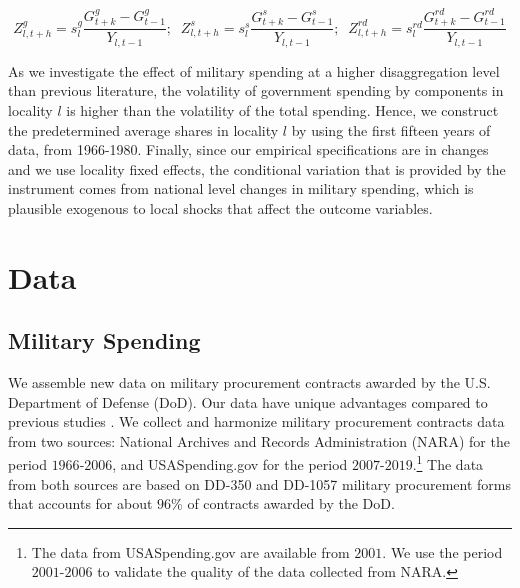 \documentclass[dv_diss_main.tex]{subfiles}
\begin{document}
\begin{equation}
    Z_{l,t+h}^g = s_{l}^g \frac{G^g_{t+k}-G^g_{t-1}}{Y_{l,t-1}};\;\;Z_{l,t+h}^s = s_{l}^s \frac{G^s_{t+k}-G^s_{t-1}}{Y_{l,t-1}};\;\;Z_{l,t+h}^{rd} = s_{l}^{rd} \frac{G^{rd}_{t+k}-G^{rd}_{t-1}}{Y_{l,t-1}}
    \label{eq:fm_iv2}
\end{equation}

As we investigate the effect of military spending at a higher disaggregation level than previous literature, the volatility of government spending by components in locality $l$ is higher than the volatility of the total spending. Hence, we construct the predetermined average shares in locality $l$ by using the first fifteen years of data, from 1966-1980. Finally, since our empirical specifications are in changes and we use locality fixed effects, the conditional variation that is provided by the instrument comes from national level changes in military spending, which is plausible exogenous to local shocks that affect the outcome variables.





\section{Data}
\label{sec:data}


\subsection{Military Spending}
\label{subsec:data_mil}

We assemble new data on military procurement contracts awarded by the U.S. Department of Defense (DoD). Our data have unique advantages compared to previous studies \citep{Nakamura2014, Dupor2017, Auerbach2020}. We collect and harmonize military procurement contracts data from two sources: National Archives and Records Administration (NARA) for the period $1966$-$2006$, and USASpending.gov for the period $2007$-$2019$.\footnote{The data from USASpending.gov are available from $2001$. We use the period $2001$-$2006$ to validate the quality of the data collected from NARA.} The data from both sources are based on DD-350 and DD-1057 military procurement forms that accounts for about $96\%$ of contracts awarded by the DoD.
\end{document}
